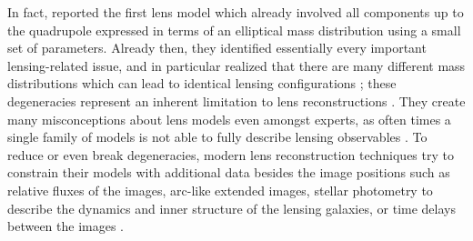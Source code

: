 In fact,  reported the first lens model which already
involved all components up to the quadrupole expressed in terms of an elliptical
mass distribution using a small set of parameters.  Already then, they
identified essentially every important lensing-related issue, and in particular
realized that there are many different mass distributions which can lead to
identical lensing configurations ; these degeneracies
represent an inherent limitation to lens reconstructions .
They create many misconceptions about lens models even amongst experts, as often
times a single family of models is not able to fully describe lensing
observables .  To reduce or even break
degeneracies, modern lens reconstruction techniques try to constrain their
models with additional data besides the image positions such as relative fluxes
of the images, arc-like extended images, stellar photometry to describe the
dynamics and inner structure of the lensing galaxies, or time delays between the
images .